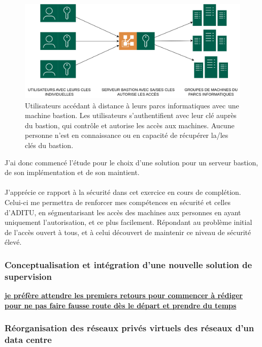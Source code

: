 \begin{figure}[H] %
  \centering
  \captionsetup{justification=centering}
  \includegraphics[scale = 0.15]{images/diagrammes/bastion/bastion.png}
  \caption{Utilisateurs accédant à distance à leurs parcs informatiques avec une machine bastion. Les utilisateurs s'authentifient avec leur clé auprès du bastion, qui contrôle et autorise les accès aux machines. Aucune personne n'est en connaissance ou en capacité de récupérer la/les clés du bastion.}  
  \label{fig:bastion} %
\end{figure}

\noindent J'ai donc commencé l'étude pour le choix d'une solution pour un serveur bastion, de son implémentation et de son maintient.
\\ \\
J'apprécie ce rapport à la sécurité dans cet exercice en cours de complétion. Celui-ci me permettra de renforcer mes compétences en sécurité et celles d'ADITU, en ségmentarisant les accès des machines aux personnes en ayant uniquement l'autorisation, et ce plus facilement. Répondant au problème initial de l'accès ouvert à tous, et à celui découvert de maintenir ce niveau de sécurité élevé.

\subsubsection{Conceptualisation et intégration d'une nouvelle solution de supervision}

\underline{\textbf{je préfère attendre les premiers retours pour commencer à rédiger}}
\underline{\textbf{pour ne pas faire fausse route dès le départ et prendre du temps}}

\subsubsection{Réorganisation des réseaux privés virtuels des réseaux d'un data centre}

